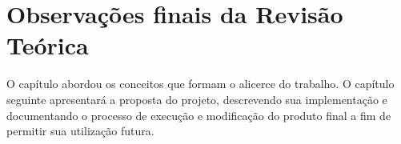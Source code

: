 \section{Observações finais da Revisão Teórica}
{ O capítulo abordou os conceitos que formam o alicerce do trabalho. O capítulo
    seguinte apresentará a proposta do projeto, descrevendo sua implementação
    e documentando o processo de execução e modificação do produto final a fim
    de permitir sua utilização futura.
}

